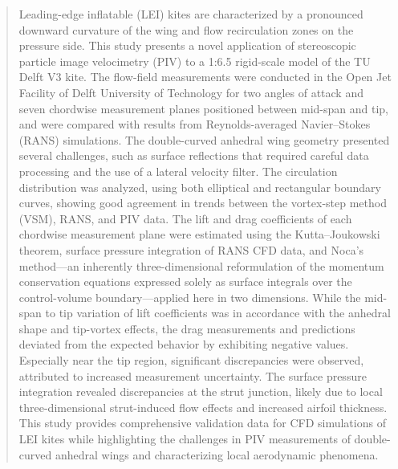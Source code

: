 \documentclass[wes, manuscript]{copernicus}
\begin{document}
\begin{abstract}
%
Leading-edge inflatable (LEI) kites are characterized by a pronounced downward curvature of the wing and flow recirculation zones on the pressure side. 
This study presents a novel application of stereoscopic particle image velocimetry (PIV) to a 1:6.5 rigid-scale model of the TU Delft V3 kite. 
The flow-field measurements were conducted in the Open Jet Facility of Delft University of Technology for two angles of attack and seven chordwise measurement planes positioned between mid-span and tip, and were compared with results from Reynolds-averaged Navier–Stokes (RANS) simulations. The double-curved anhedral wing geometry presented several challenges, such as surface reflections that required careful data processing and the use of a lateral velocity filter. The circulation distribution was analyzed, using both elliptical and rectangular boundary curves, showing good agreement in trends between the vortex-step method (VSM), RANS, and PIV data. The lift and drag coefficients of each chordwise measurement plane were estimated using the Kutta–Joukowski theorem, surface pressure integration of RANS CFD data, and Noca’s method—an inherently three-dimensional reformulation of the momentum conservation equations expressed solely as surface integrals over the control-volume boundary—applied here in two dimensions. While the mid-span to tip variation of lift coefficients was in accordance with the anhedral shape and tip-vortex effects, the drag measurements and predictions deviated from the expected behavior by exhibiting negative values. Especially near the tip region, significant discrepancies were observed, attributed to increased measurement uncertainty. The surface pressure integration revealed discrepancies at the strut junction, likely due to local three-dimensional strut-induced flow effects and increased airfoil thickness. This study provides comprehensive validation data for CFD simulations of LEI kites while highlighting the challenges in PIV measurements of double-curved anhedral wings and characterizing local aerodynamic phenomena.
%
\end{abstract}
%
\end{document}
